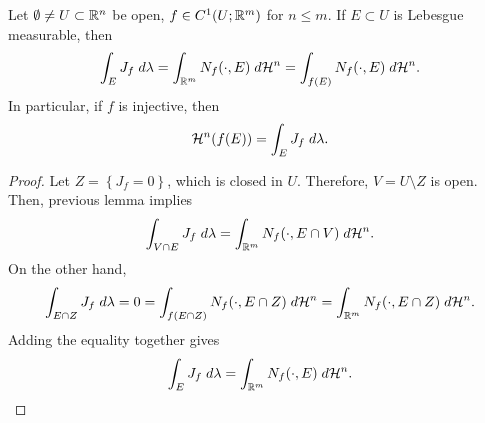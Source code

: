 \documentclass[a4paper]{article}
\begin{document}
\begin{thm}
Let $\emptyset \neq U \subset \mathbb{R}^n$ be open, $f \in C^1(U; 
\mathbb{R}^m)$ for $n \leq m$. If $E \subset U$ is Lebesgue measurable, 
then 
\[
\int_E J_f \; d \lambda = \int_{\mathbb{R}^m} N_f(\cdot, E) \; d \mathcal{H}^n
= \int_{f(E)} N_f(\cdot, E) \; d \mathcal{H}^n.
\]
In particular, if $f$ is injective, then 
\[
\mathcal{H}^n (f(E)) = \int_E J_f \; d \lambda.
\]
\end{thm}

\begin{proof}
Let $Z = \left\{ J_f = 0 \right\}$, which is closed in $U$. 
Therefore, $V = U \setminus Z$ is open. Then, previous lemma 
implies 
\[
\int_{V \cap E} J_f \; d \lambda 
= \int_{\mathbb{R}^m} N_f(\cdot, E \cap V) \; d \mathcal{H}^n.
\]
On the other hand, 
\[
\int_{E \cap Z} J_f \; d \lambda = 0 
= \int_{f(E \cap Z)} N_f (\cdot, E \cap Z) \; d \mathcal{H}^n
= \int_{\mathbb{R}^m} N_f(\cdot, E \cap Z) \; d \mathcal{H}^n.
\]
Adding the equality together gives 
\[
\int_E J_f \; d \lambda = \int_{\mathbb{R}^m} N_f(\cdot, E) \; d \mathcal{H}^n.
\]
\end{proof}
\end{document}
